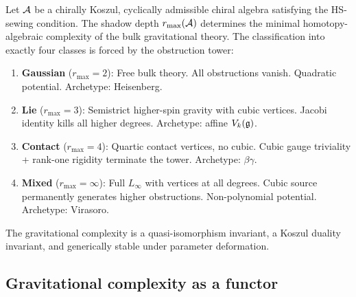 \begin{maintheorem}
\ClaimStatusProvedHere
{}
Let $\mathcal{A}$ be a chirally Koszul, cyclically admissible chiral
algebra satisfying the HS-sewing condition.
The shadow depth $r_{\max}(\mathcal{A})$ determines the minimal
homotopy-algebraic complexity of the bulk gravitational theory.
The classification into exactly four classes is forced by the
obstruction tower:
\begin{enumerate}[label=\textup{(\roman*)}]
\item \textbf{Gaussian} ($r_{\max} = 2$):
 Free bulk theory. All obstructions vanish.
 Quadratic potential. Archetype: Heisenberg.

\item \textbf{Lie} ($r_{\max} = 3$):
 Semistrict higher-spin gravity with cubic vertices.
 Jacobi identity kills all higher degrees.
 Archetype: affine $V_k(\mathfrak{g})$.

\item \textbf{Contact} ($r_{\max} = 4$):
 Quartic contact vertices, no cubic.
 Cubic gauge triviality + rank-one rigidity terminate the tower.
 Archetype: $\beta\gamma$.

\item \textbf{Mixed} ($r_{\max} = \infty$):
 Full $L_\infty$ with vertices at all degrees.
 Cubic source permanently generates higher obstructions.
 Non-polynomial potential. Archetype: Virasoro.
\end{enumerate}
The gravitational complexity is a quasi-isomorphism invariant,
a Koszul duality invariant, and generically stable under
parameter deformation.
\end{maintheorem}



\subsection{Gravitational complexity as a functor}

